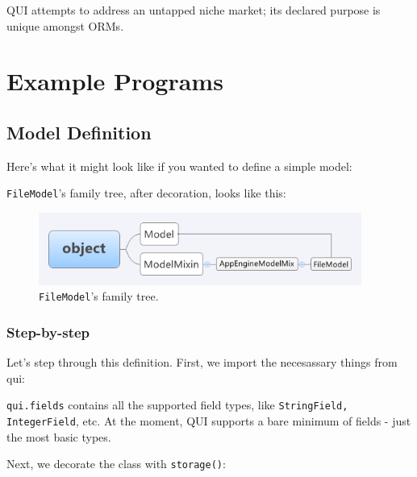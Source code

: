 \documentclass{article} %
\newenvironment{inset}
{
\begin{center}
\begin{minipage}{0.85\textwidth}
}
{
\end{minipage}
\end{center}
}
\newcommand{\il}[1]{\mbox{\lstinline{#1}}}
\newcommand{\lstslice}[3]{
\begin{inset}

\end{inset}
}
\begin{document}
QUI attempts to address an untapped niche market; its declared purpose is unique amongst ORMs.

\section{Example Programs}
\label{examples}
\subsection{Model Definition}
Here's what it might look like if you wanted to define a simple model:

\il{FileModel}'s family tree, after decoration, looks like this:
\begin{figure}[h!tb]
\centering
\includegraphics[width=400px]{FileModelInheritanceTree}
\caption{\il{FileModel}'s family tree.}
\end{figure}

\subsubsection{Step-by-step}
Let's step through this definition. First, we import the necesassary things from qui:
\lstslice{1}{4}{model_definitions.py}
\il{qui.fields} contains all the supported field types, like \il{StringField, IntegerField}, etc. At the moment, QUI supports 
a bare minimum of fields - just the most basic types.

Next, we decorate the class with \il{storage()}:

\lstslice{6}{7}{model_definitions.py}
\end{document}
